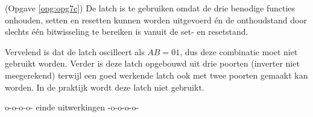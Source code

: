 \documentclass[a4paper,12pt,addpoints,fleqn,dutch]{tisdexam}
\begin{document}
\begin{questions}
(Opgave \ref{opg:opg7c}) 
De latch is te gebruiken omdat de drie benodige functies onhouden, setten en
resetten kunnen worden uitgevoerd \'{e}n de onthoudstand door slechts
\'{e}\'{e}n bitwisseling te bereiken is vanuit de set- en resetstand.

Vervelend is dat de latch oscilleert als $AB = 01$, dus deze combinatie
moet niet gebruikt worden. Verder is deze latch opgebouwd uit drie poorten
(inverter niet meegerekend) terwijl een goed werkende latch ook met twee
poorten gemaakt kan worden. In de praktijk wordt deze latch niet gebruikt.

\vspace{4em}
\begin{center}
o-o-o-o- einde uitwerkingen -o-o-o-o-
\end{center}

\fi  %

\end{questions}
\end{document}
